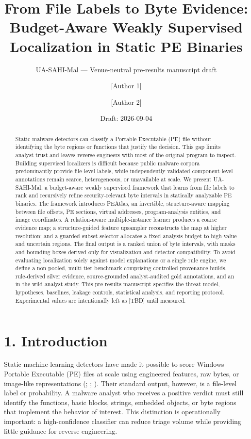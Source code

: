 \documentclass[
  10pt,
]{article}
\title{From File Labels to Byte Evidence: Budget-Aware Weakly Supervised
Localization in Static PE Binaries}
\subtitle{UA-SAHI-Mal --- Venue-neutral pre-results manuscript draft}
\author{{[}Author 1{]} \and {[}Author 2{]}}
\date{Draft: 2026-09-04}
\begin{document}
\maketitle
\begin{abstract}
Static malware detectors can classify a Portable Executable (PE) file
without identifying the byte regions or functions that justify the
decision. This gap limits analyst trust and leaves reverse engineers
with most of the original program to inspect. Building supervised
localizers is difficult because public malware corpora predominantly
provide file-level labels, while independently validated component-level
annotations remain scarce, heterogeneous, or unavailable at scale. We
present UA-SAHI-Mal, a budget-aware weakly supervised framework that
learns from file labels to rank and recursively refine security-relevant
byte intervals in statically analyzable PE binaries. The framework
introduces PEAtlas, an invertible, structure-aware mapping between file
offsets, PE sections, virtual addresses, program-analysis entities, and
image coordinates. A relation-aware multiple-instance learner produces a
coarse evidence map; a structure-guided feature upsampler reconstructs
the map at higher resolution; and a guarded subset selector allocates a
fixed analysis budget to high-value and uncertain regions. The final
output is a ranked union of byte intervals, with masks and bounding
boxes derived only for visualization and detector compatibility. To
avoid evaluating localization solely against model explanations or a
single rule engine, we define a non-pooled, multi-tier benchmark
comprising controlled-provenance builds, rule-derived silver evidence,
source-grounded analyst-audited gold annotations, and an in-the-wild
analyst study. This pre-results manuscript specifies the threat model,
hypotheses, baselines, leakage controls, statistical analysis, and
reporting protocol. Experimental values are intentionally left as
{[}TBD{]} until measured.
\end{abstract}

{
\setcounter{tocdepth}{3}
\tableofcontents
}
\section{1. Introduction}\label{introduction}

Static machine-learning detectors have made it possible to score Windows
Portable Executable (PE) files at scale using engineered features, raw
bytes, or image-like representations
(;
;
). Their
standard output, however, is a file-level label or probability. A
malware analyst who receives a positive verdict must still identify the
functions, basic blocks, strings, embedded objects, or byte regions that
implement the behavior of interest. This distinction is operationally
important: a high-confidence classifier can reduce triage volume while
providing little guidance for reverse engineering.
\end{document}
